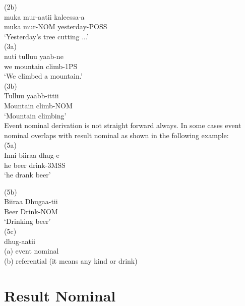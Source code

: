 \documentclass[11pt,a4paper]{article}
\begin{document}
(2b)	\\
\indent muka		mur-aatii	kaleessa-a\\
\indent muka		mur-NOM	yesterday-POSS\\
\indent ‘Yesterday’s tree cutting ...’\\


(3a) 	\\
\indent nuti 		tulluu 		yaab-ne 	\\	
\indent we		mountain	climb-1PS\\
\indent ‘We climbed a mountain.’\\


(3b) \\
\indent Tulluu yaabb-ittii 	\\	
\indent Mountain climb-NOM	\\
\indent ‘Mountain climbing’\\

Event nominal derivation is not straight forward always. In some cases event nominal overlaps with result nominal as shown in the following example:\\

(5a)  \\
\indent Inni 	 biiraa 	dhug-e\\
\indent he 	 beer 	drink-3MSS\\
\indent ‘he drank beer’\indent

(5b) 	\\
\indent Biiraa 	Dhugaa-tii\\
\indent Beer  	Drink-NOM\\
\indent‘Drinking beer’\\

(5c)\\
\indent	dhug-aatii\\
\indent (a) event nominal \\
\indent (b) referential (it means any kind or drink)\\

\section{Result Nominal}
\end{document}
